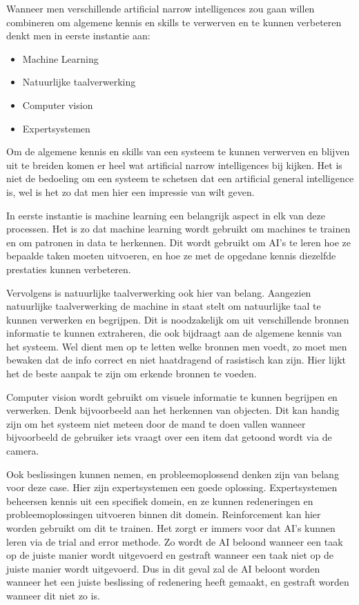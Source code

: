Wanneer men verschillende artificial narrow intelligences zou gaan willen combineren om algemene kennis en skills te verwerven en te kunnen verbeteren denkt men in eerste instantie aan:

\begin{itemize}
    \item Machine Learning
    \item Natuurlijke taalverwerking
    \item Computer vision
    \item Expertsystemen
\end{itemize}

Om de algemene kennis en skills van een systeem te kunnen verwerven en blijven uit te breiden komen er heel wat artificial narrow intelligences bij kijken. Het is niet de bedoeling om een systeem te schetsen dat een artificial general intelligence is, wel is het zo dat men hier een impressie van wilt geven.

In eerste instantie is machine learning een belangrijk aspect in elk van deze processen. Het is zo dat machine learning wordt gebruikt om machines te trainen en om patronen in data te herkennen. Dit wordt gebruikt om AI's te leren hoe ze bepaalde taken moeten uitvoeren, en hoe ze met de opgedane kennis diezelfde prestaties kunnen verbeteren.

Vervolgens is natuurlijke taalverwerking ook hier van belang. Aangezien natuurlijke taalverwerking de machine in staat stelt om natuurlijke taal te kunnen verwerken en begrijpen. Dit is noodzakelijk om uit verschillende bronnen informatie te kunnen extraheren, die ook bijdraagt aan de algemene kennis van het systeem. Wel dient men op te letten welke bronnen men voedt, zo moet men bewaken dat de info correct en niet haatdragend of rasistisch kan zijn. Hier lijkt het de beste aanpak te zijn om erkende bronnen te voeden.

Computer vision wordt gebruikt om visuele informatie te kunnen begrijpen en verwerken. Denk bijvoorbeeld aan het herkennen van objecten. Dit kan handig zijn om het systeem niet meteen door de mand te doen vallen wanneer bijvoorbeeld de gebruiker iets vraagt over een item dat getoond wordt via de camera. 

Ook beslissingen kunnen nemen, en probleemoplossend denken zijn van belang voor deze case. Hier zijn expertsystemen een goede oplossing. Expertsystemen beheersen kennis uit een specifiek domein, en ze kunnen redeneringen en probleemoplossingen uitvoeren binnen dit domein. Reinforcement kan hier worden gebruikt om dit te trainen. Het zorgt er immers voor dat AI's kunnen leren via de trial and error methode. Zo wordt de AI beloond wanneer een taak op de juiste manier wordt uitgevoerd en gestraft wanneer een taak niet op de juiste manier wordt uitgevoerd. Dus in dit geval zal de AI beloont worden wanneer het een juiste beslissing of redenering heeft gemaakt, en gestraft worden wanneer dit niet zo is.

